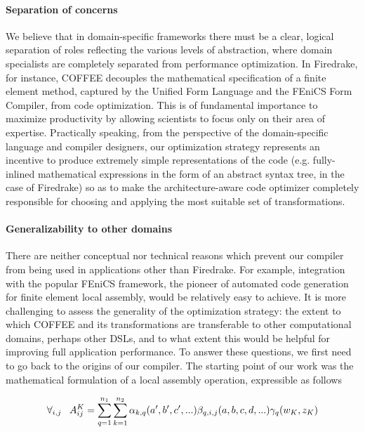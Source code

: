 \paragraph{Separation of concerns} We believe that in domain-specific frameworks there must be a clear, logical separation of roles reflecting the various levels of abstraction, where domain specialists are completely separated from performance optimization. In Firedrake, for instance, COFFEE decouples the mathematical specification of a finite element method, captured by the Unified Form Language and the FEniCS Form Compiler, from code optimization. This is of fundamental importance to maximize productivity by allowing scientists to focus only on their area of expertise. Practically speaking, from the perspective of the domain-specific language and compiler designers, our optimization strategy represents an incentive to produce extremely simple representations of the code (e.g. fully-inlined mathematical expressions in the form of an abstract syntax tree, in the case of Firedrake) so as to make the architecture-aware code optimizer completely responsible for choosing and applying the most suitable set of transformations.

\paragraph{Generalizability to other domains} There are neither conceptual nor technical reasons which prevent our compiler from being used in applications other than Firedrake. For example, integration with the popular FEniCS framework, the pioneer of automated code generation for finite element local assembly, would be relatively easy to achieve. It is more challenging to assess the generality of the optimization strategy: the extent to which COFFEE and its transformations are transferable to other computational domains, perhaps other DSLs, and to what extent this would be helpful for improving full application performance. To answer these questions, we first need to go back to the origins of our compiler. The starting point of our work was the mathematical formulation of a local assembly operation, expressible as follows

\begin{equation}
\label{eq:assembly-model}
\scriptsize
\forall_{i, j} ~~~ A_{ij}^K = \sum_{q=1}^{n_1} \sum_{k=1}^{n_2} \alpha_{k, q}(a', b', c', ...) \beta_{q, i, j}(a, b, c, d, ...) \gamma_{q}(w_K, z_K)
\end{equation}

